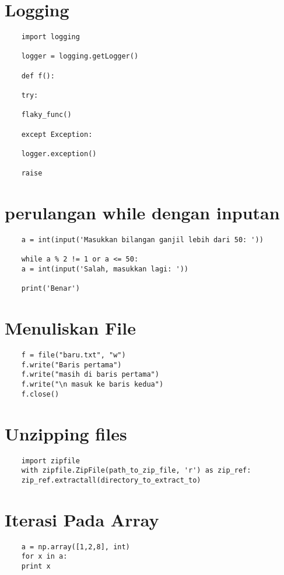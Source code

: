 \documentclass[12pt]{article} %
\begin{document}
\section {Logging}
\begin{lstlisting}
	import logging
	
	logger = logging.getLogger()
	
	def f():
	
	try:
	
	flaky_func()
	
	except Exception:
	
	logger.exception()
	
	raise
\end{lstlisting}

\section {perulangan while dengan inputan}
\begin{lstlisting}
	a = int(input('Masukkan bilangan ganjil lebih dari 50: '))
	
	while a % 2 != 1 or a <= 50:
	a = int(input('Salah, masukkan lagi: '))
	
	print('Benar')
\end{lstlisting}

\section {Menuliskan File}
\begin{lstlisting}
	f = file("baru.txt", "w")
	f.write("Baris pertama")
	f.write("masih di baris pertama")
	f.write("\n masuk ke baris kedua")
	f.close()
\end{lstlisting}

\section {Unzipping files}
\begin{lstlisting}
	import zipfile
	with zipfile.ZipFile(path_to_zip_file, 'r') as zip_ref:
	zip_ref.extractall(directory_to_extract_to)
\end{lstlisting}

\section {Iterasi Pada Array}
\begin{lstlisting}
 	a = np.array([1,2,8], int)
	for x in a:
	print x
\end{lstlisting}
\end{document}
